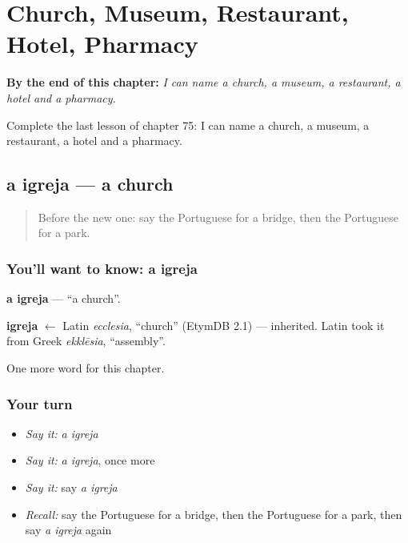 
\chapter{Church, Museum, Restaurant, Hotel, Pharmacy}
\label{ch:pt-church-museum-restaurant-hotel-pharmacy}

\begin{chapteropening}
\textbf{By the end of this chapter:} \emph{I can name a church, a museum, a restaurant, a hotel and a pharmacy.}

Complete the last lesson of chapter 75: I can name a church, a museum, a restaurant, a hotel and a pharmacy.
\end{chapteropening}

\section[a igreja]{a igreja — a church}

\label{lesson:PT-C75-igreja}



\begin{quote}
Before the new one: say the Portuguese for a bridge, then the Portuguese for a park.
\end{quote}

\subsection*{You'll want to know: a igreja}
\textbf{a igreja} — \textquotedblleft{}a church\textquotedblright{}.

\begin{cousinweb}
\textbf{igreja} $\leftarrow$ Latin \emph{ecclesia}, \textquotedblleft{}church\textquotedblright{} (EtymDB 2.1) — inherited. Latin took it from Greek \emph{ekklēsia}, \textquotedblleft{}assembly\textquotedblright{}.
\end{cousinweb}

\begin{grammarlens}[title={What you've built}]
One more word for this chapter.
\end{grammarlens}

\subsection*{Your turn}
\begin{itemize}
\raggedright
  \item \emph{Say it:} \emph{a igreja}
  \item \emph{Say it:} \emph{a igreja}, once more
  \item \emph{Say it:} say \emph{a igreja}
  \item \emph{Recall:} say the Portuguese for a bridge, then the Portuguese for a park, then say \emph{a igreja} again
\end{itemize}

